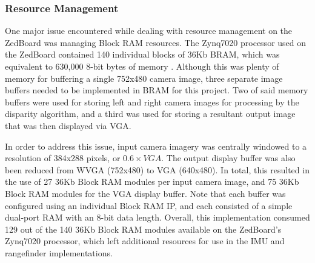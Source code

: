 \subsubsection{Resource Management} \label{dataman}
One major issue encountered while dealing with resource management on the ZedBoard was managing Block RAM resources. The Zynq7020 processor used on the ZedBoard contained 140 individual blocks of 36Kb BRAM, which was equivalent to 630,000 8-bit bytes of memory \cite{zynq7bram}. Although this was plenty of memory for buffering a single 752x480 camera image, three separate image buffers needed to be implemented in BRAM for this project. Two of said memory buffers were used for storing left and right camera images for processing by the disparity algorithm, and a third was used for storing a resultant output image that was then displayed via VGA.
\par
In order to address this issue, input camera imagery was centrally windowed to a resolution of 384x288 pixels, or $0.6\times{}VGA$. The output display buffer was also been reduced from WVGA (752x480) to VGA (640x480). In total, this resulted in the use of 27 36Kb Block RAM modules per input camera image, and 75 36Kb Block RAM modules for the VGA display buffer. Note that each buffer was configured using an individual Block RAM IP, and each consisted of a simple dual-port RAM with an 8-bit data length. Overall, this implementation consumed 129 out of the 140 36Kb Block RAM modules available on the ZedBoard's Zynq7020 processor, which left additional resources for use in the IMU and rangefinder implementations. 